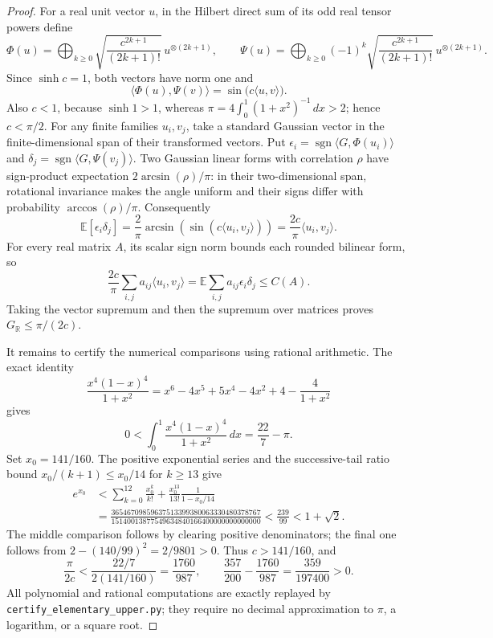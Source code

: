 \documentclass[11pt]{article}
\begin{document}
\begin{proof}
For a real unit vector $u$, in the Hilbert direct sum of its odd
real tensor powers define
\[
 \Phi(u)=\bigoplus_{k\geq0}
       \sqrt{\frac{c^{2k+1}}{(2k+1)!}}\,u^{\otimes(2k+1)},\qquad
 \Psi(u)=\bigoplus_{k\geq0}(-1)^k
       \sqrt{\frac{c^{2k+1}}{(2k+1)!}}\,u^{\otimes(2k+1)}.
\]
Since $\sinh c=1$, both vectors have norm one and
\[
 \langle\Phi(u),\Psi(v)\rangle
                    =\sin\bigl(c\langle u,v\rangle\bigr).
\]
Also $c<1$, because $\sinh1>1$, whereas
$\pi=4\int_0^1(1+x^2)^{-1}\,dx>2$; hence $c<\pi/2$.
For any finite families $u_i,v_j$, take a standard Gaussian vector
in the finite-dimensional span of their transformed vectors.  Put
$\epsilon_i=\operatorname{sgn}\langle G,\Phi(u_i)\rangle$ and
$\delta_j=\operatorname{sgn}\langle G,\Psi(v_j)\rangle$.
Two Gaussian linear forms with correlation $\rho$ have sign-product
expectation $2\arcsin(\rho)/\pi$: in their two-dimensional span,
rotational invariance makes the angle uniform and their signs
 differ with probability $\arccos(\rho)/\pi$.  Consequently
\[
 \mathbb E[\epsilon_i\delta_j]
 =\frac2\pi\arcsin\!\left(\sin(c\langle u_i,v_j\rangle)\right)
 =\frac{2c}{\pi}\langle u_i,v_j\rangle.
\]
For every real matrix $A$, its scalar sign norm bounds each rounded
bilinear form, so
\[
 \frac{2c}{\pi}\sum_{i,j}a_{ij}\langle u_i,v_j\rangle
 =\mathbb E\sum_{i,j}a_{ij}\epsilon_i\delta_j\leq C(A).
\]
Taking the vector supremum and then the supremum over matrices
proves $G_{\mathbb R}\leq\pi/(2c)$.

It remains to certify the numerical comparisons using rational
arithmetic.  The exact identity
\[
 \frac{x^4(1-x)^4}{1+x^2}
 =x^6-4x^5+5x^4-4x^2+4-\frac4{1+x^2}
\]
gives
\[
 0<\int_0^1\frac{x^4(1-x)^4}{1+x^2}\,dx
                         =\frac{22}{7}-\pi.
\]
Set $x_0=141/160$.  The positive exponential series and the
successive-tail ratio bound $x_0/(k+1)\leq x_0/14$ for $k\geq13$
give
\begin{align*}
 e^{x_0}
 &<\sum_{k=0}^{12}\frac{x_0^k}{k!}
       +\frac{x_0^{13}}{13!}\frac1{1-x_0/14}\\
 &=\frac{36546709859637513399380063330480378767}
          {15140013877549634840166400000000000000}
  <\frac{239}{99}<1+\sqrt2.
\end{align*}
The middle comparison follows by clearing positive denominators;
the final one follows from
$2-(140/99)^2=2/9801>0$.  Thus $c>141/160$, and
\[
 \frac\pi{2c}<\frac{22/7}{2(141/160)}
                =\frac{1760}{987},\qquad
 \frac{357}{200}-\frac{1760}{987}=\frac{359}{197400}>0.
\]
All polynomial and rational computations are exactly replayed by
\texttt{certify\_elementary\_upper.py}; they require no decimal
approximation to $\pi$, a logarithm, or a square root.
\end{proof}
\end{document}
